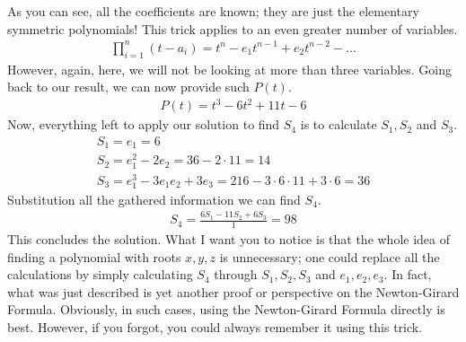 \documentclass{article}
\begin{document}
As you can see, all the coefficients are known; they are just the elementary symmetric polynomials! This trick applies to an even greater number of variables.
\begin{gather*}
	\prod_{i = 1}^{n} (t - a_i) = t^n - e_1 t^{n - 1} + e_2 t^{n - 2} - ... 
\end{gather*}
However, again, here, we will not be looking at more than three variables. Going back to our result, we can now provide such \(P(t)\).
\begin{gather*}
	P(t) = t^3 - 6t^2 + 11t - 6
\end{gather*}
Now, everything left to apply our solution to find \(S_4\) is to calculate \(S_1, S_2\) and \(S_3\).
\begin{gather*}
	S_1 = e_1 = 6 \\
	S_2 = e_1^2 - 2e_2 = 36 - 2 \cdot 11  = 14 \\
	S_3 = e_1^3 - 3e_1e_2 + 3e_3 = 216 - 3 \cdot 6 \cdot 11 + 3 \cdot 6 = 36
\end{gather*}
Substitution all the gathered information we can find \(S_4\).
\begin{gather*}
	S_4 = \frac{6 S_1 - 11 S_2 + 6 S_3}{1} = 98
\end{gather*}
This concludes the solution. What I want you to notice is that the whole idea of finding a polynomial with roots \(x, y, z\) is unnecessary; one could replace all the calculations by simply calculating \(S_4\) through \(S_1, S_2, S_3\) and \(e_1, e_2, e_3\). In fact, what was just described is yet another proof or perspective on the Newton-Girard Formula. Obviously, in such cases, using the Newton-Girard Formula directly is best. However, if you forgot, you could always remember it using this trick.

\newpage
\tableofcontents
\end{document}

